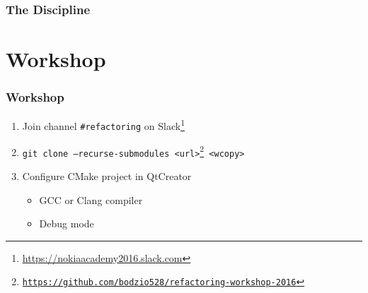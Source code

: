 \documentclass[english]{beamer}
\begin{document}
\begin{frame}
\frametitle{The Discipline}
\begin{center}
\end{center}
\end{frame}

\section{Workshop}

\begin{frame}[fragile]
\frametitle{Workshop}

\begin{enumerate}[<+->]
\item Join channel \texttt{\#refactoring} on Slack\footnote{\url{https://nokiaacademy2016.slack.com}}
\item \texttt{git clone --recurse-submodules <url>\footnote{\url{https://github.com/bodzio528/refactoring-workshop-2016}} <wcopy>}
\item Configure CMake project in QtCreator
\begin{itemize}
	\item GCC or Clang compiler
	\item Debug mode
\end{itemize}
\end{enumerate}
\end{frame}
\end{document}
